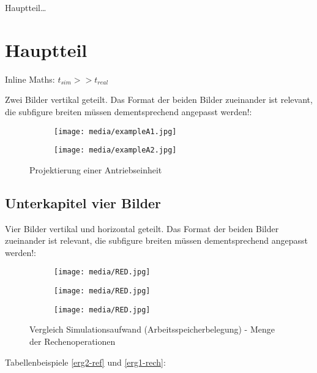 
Hauptteil\ldots

\section{Hauptteil}
Inline Maths: $t_{sim} >> t_{real}$

Zwei Bilder vertikal geteilt. Das Format der beiden Bilder zueinander ist relevant, die subfigure breiten
müssen dementsprechend angepasst werden!:
\begin{figure}[H]
  \hfill
  \begin{subfigure}[t]{0.65\textwidth}
    \texttt{[image: media/exampleA1.jpg]}
  \end{subfigure}
  \hfill
  \begin{subfigure}[t]{0.3\textwidth}
    \texttt{[image: media/exampleA2.jpg]}
  \end{subfigure}
  \hfill
  \captionsetup{width=0.8\textwidth}
  \caption[Projektierung]{Projektierung einer Antriebseinheit}
  \label{antrieb1}
  \vspace{-0.4cm}
\end{figure}

\newpage

\subsection{Unterkapitel vier Bilder}

Vier Bilder vertikal und horizontal geteilt. Das Format der beiden Bilder zueinander ist relevant, die subfigure breiten
müssen dementsprechend angepasst werden!:
\begin{figure}[H]
  \hfill
  \begin{subfigure}[t]{0.49\textwidth}
    \texttt{[image: media/RED.jpg]}
  \end{subfigure}
  \hfill
  \begin{subfigure}[t]{0.49\textwidth}
    \texttt{[image: media/RED.jpg]}
  \end{subfigure}
  \hfill

  \vspace{0.01\textwidth}

  \hfill
  \begin{subfigure}[b]{0.49\textwidth}
    \texttt{[image: media/RED.jpg]}
  \end{subfigure}
  \hfill
  \begin{subfigure}[b]{0.49\textwidth}
  \end{subfigure}
  \hfill

  \captionsetup{width=0.8\textwidth}
  \caption[Vergleich Arbeitsspeicherbelegung - Rechenoperationen]{Vergleich Simulationsaufwand (Arbeitsspeicherbelegung) - Menge der Rechenoperationen}
  \label{vergleich1dot5}
  \vspace{-0.4cm}
\end{figure}
Tabellenbeispiele \ref{erg2-ref} und \ref{erg1-rech}:

